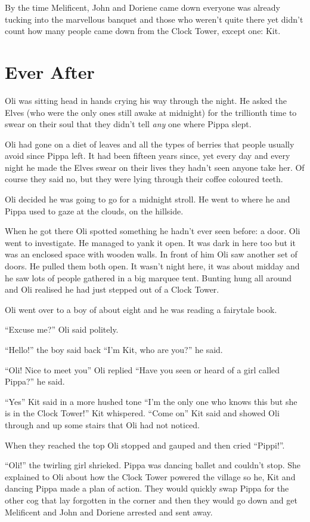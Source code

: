 By the time Melificent, John and Doriene came down everyone was already
tucking into the marvellous banquet and those who weren't quite there
yet didn't count how many people came down from the Clock Tower, except
one: Kit.

\chapter{Ever After}

Oli was sitting head in hands crying his way through the night. He asked
the Elves (who were the only ones still awake at midnight) for the
trillionth time to swear on their soul that they didn't tell \emph{any}
one where Pippa slept.

Oli had gone on a diet of leaves and all the types of berries that
people usually avoid since Pippa left. It had been fifteen years since,
yet every day and every night he made the Elves swear on their lives
they hadn't seen anyone take her. Of course they said no, but they were
lying through their coffee coloured teeth.

Oli decided he was going to go for a midnight stroll. He went to where
he and Pippa used to gaze at the clouds, on the hillside.

When he got there Oli spotted something he hadn't ever seen before: a
door. Oli went to investigate. He managed to yank it open. It was dark
in here too but it was an enclosed space with wooden walls. In front of
him Oli saw another set of doors. He pulled them both open. It wasn't
night here, it was about midday and he saw lots of people gathered in a
big marquee tent. Bunting hung all around and Oli realised he had just
stepped out of a Clock Tower.

Oli went over to a boy of about eight and he was reading a fairytale
book.

``Excuse me?'' Oli said politely.

``Hello!'' the boy said back ``I'm Kit, who are you?'' he said.

``Oli! Nice to meet you'' Oli replied ``Have you seen or heard of a girl
called Pippa?'' he said.

``Yes'' Kit said in a more hushed tone ``I'm the only one who knows this
but she is in the Clock Tower!'' Kit whispered. ``Come on'' Kit said and
showed Oli through and up some stairs that Oli had not noticed.

When they reached the top Oli stopped and gauped and then cried
``Pippi!''.

``Oli!'' the twirling girl shrieked. Pippa was dancing ballet and
couldn't stop. She explained to Oli about how the Clock Tower powered
the village so he, Kit and dancing Pippa made a plan of action. They
would quickly swap Pippa for the other cog that lay forgotten in the
corner and then they would go down and get Melificent and John and
Doriene arrested and sent away.

